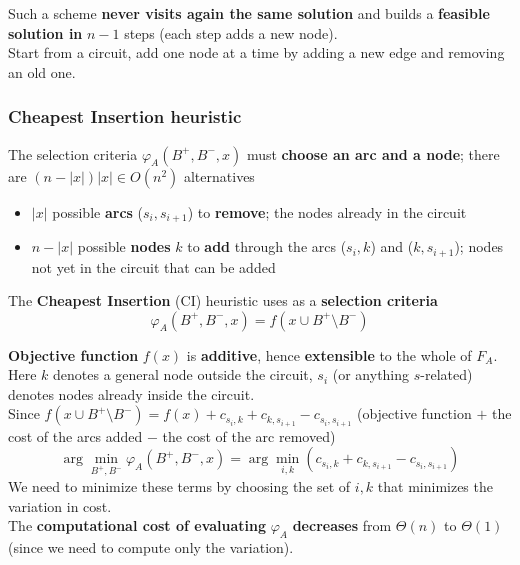 \documentclass[11pt]{article}
\begin{document}
	Such a scheme \textbf{never visits again the same solution} and builds a \textbf{feasible solution in} $n - 1$ steps (each step adds a new node).\\
	
	Start from a circuit, add one node at a time by adding a new edge and removing an old one.\\
	
	\newpage
	
	\subsubsection{Cheapest Insertion heuristic} 
	The selection criteria $\varphi_A (B^+, B^-, x)$ must \textbf{choose an arc and a node}; there are $(n − |x|) |x| \in O (n^2)$ alternatives
	\begin{itemize}
		\item $|x|$ possible \textbf{arcs} ($s_i , s_{i+1}$) to \textbf{remove}; the nodes already in the circuit
		\item $n − |x|$ possible \textbf{nodes} $k$ to \textbf{add} through the arcs ($s_i , k$) and ($k, s_{i+1}$); nodes not yet in the circuit that can be added
	\end{itemize}
	
	The \textbf{Cheapest Insertion} (CI) heuristic uses as a \textbf{selection criteria}
	$$ \varphi_A (B^+, B^-, x) = f \left(x \cup B^+ \setminus B^- \right) $$
	
	\textbf{Objective function} $f (x)$ is \textbf{additive}, hence \textbf{extensible} to the whole of $F_A$.\\
	
	Here $k$ denotes a general node outside the circuit, $s_i$ (or anything $s$-related) denotes nodes already inside the circuit.\\
	
	Since $f (x \cup B^+ \setminus B^-) = f (x) + c_{s_i ,k} + c_{k,s_{i+1}} - c_{s_i ,s_{i+1}}$ (objective function $+$ the cost of the arcs added $-$ the cost of the arc removed)
	$$ \arg \min_{B^+, B^-} \varphi_A \left(B^+, B^-, x \right) = \arg \min_{i,k} (c_{s_i, k} + c_{k, s_{i+1}} - c_{s_i, s_{i+1}})$$
	We need to minimize these terms by choosing the set of $i,k$ that minimizes the variation in cost. \\
	
	The \textbf{computational cost of evaluating} $\varphi_A$ \textbf{decreases} from $\Theta (n)$ to $\Theta (1)$ (since we need to compute only the variation).\\
	
\end{document}
